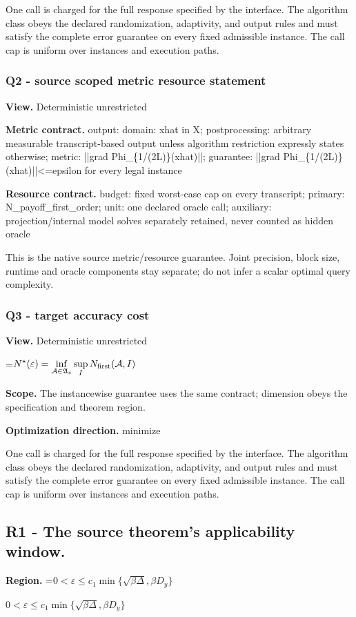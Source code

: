 \documentclass[10pt,a4paper]{article}
\newcommand{\AtlasMath}[1]{\par\begingroup\centering\setbox0=\hbox{$\displaystyle #1$}\ifdim\wd0>1.4\linewidth\typeout{ATLAS WIDE FORMULA: \the\wd0}\fi\ifdim\wd0>\linewidth\resizebox{\linewidth}{!}{\box0}\else\box0\fi\par\endgroup}
\newcommand{\AtlasInlineMath}[1]{\begingroup\setbox0=\hbox{$#1$}\ifdim\wd0>.4\linewidth\endgroup\AtlasMath{#1}\else\endgroup$#1$\fi}
\begin{document}
One call is charged for the full response specified by the interface. The algorithm class obeys the declared randomization, adaptivity, and output rules and must satisfy the complete error guarantee on every fixed admissible instance. The call cap is uniform over instances and execution paths.

\subsubsection{Q2 - source scoped metric resource statement}
\textbf{View.} Deterministic unrestricted

\textbf{Metric contract.} output: domain: xhat in X; postprocessing: arbitrary measurable transcript-based output unless algorithm restriction expressly states otherwise; metric: ||grad Phi\_\{1/(2L)\}(xhat)||; guarantee: ||grad Phi\_\{1/(2L)\}(xhat)||<=epsilon for every legal instance

\textbf{Resource contract.} budget: fixed worst-case cap on every transcript; primary: N\_payoff\_first\_order; unit: one declared oracle call; auxiliary: projection/internal model solves separately retained, never counted as hidden oracle

This is the native source metric/resource guarantee. Joint precision, block size, runtime and oracle components stay separate; do not infer a scalar optimal query complexity.

\subsubsection{Q3 - target accuracy cost}
\textbf{View.} Deterministic unrestricted

\AtlasMath{N^\star(\varepsilon)=\inf_{\mathcal A\in\mathfrak A_\varepsilon}\sup_I N_{\rm first}(\mathcal A,I)}
\textbf{Scope.} The instancewise guarantee uses the same contract; dimension obeys the specification and theorem region.

\textbf{Optimization direction.} minimize

One call is charged for the full response specified by the interface. The algorithm class obeys the declared randomization, adaptivity, and output rules and must satisfy the complete error guarantee on every fixed admissible instance. The call cap is uniform over instances and execution paths.

\subsection{R1 - The source theorem’s applicability window.}
\textbf{Region.} \AtlasInlineMath{0<\varepsilon\le c_1\min\{\sqrt{\beta\Delta},\beta D_y\}}
\end{document}
